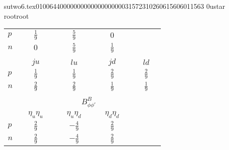                                                                                                                                                                                                                                                                                       sutwo6.tex                                                                                          0100644 0000000 0000000 00000315723 10260615606 011563  0                                                                                                    ustar   root                            root                                                                                                                                                                                                                   \documentclass[prd,amssymb,amsmath,showpacs,nofootinbib,superscriptaddress]{revtex4}
\begin{document}
\begin{table}[hb]
\begin{tabular}{l | c c c c }
$p$
  & $\frac{1}{9}$ 
  & $\frac{5}{9}$  
  & $0$\\ 
$n$
  & $0$ 
  & $\frac{5}{9}$  
  & $\frac{1}{9}$\\

\multicolumn{4}{c}{}\\
  & $ \quad ju \quad$ 
  & $ \quad lu \quad$ 
  & $\quad jd \quad$  
  & $\quad ld \quad$ \\
\hline
$p$
    & $\frac{1}{9}$ 
  & $\frac{1}{9}$  
  & $\frac{2}{9}$ 
  & $\frac{2}{9}$ \\
$n$
  & $\frac{2}{9}$ 
  & $\frac{2}{9}$  
  & $\frac{1}{9}$ 
  & $\frac{1}{9}$ \\


\multicolumn{4}{c}{}\\
  &\multicolumn{4}{c}{$B^B_{\phi\phi'}$ \phantom{sp}} \\
  & $\quad \eta_u \eta_u \quad $ 
  & $\quad \eta_u \eta_d\quad $   
  & $\quad \eta_d \eta_d\quad$ \\
\hline
$p$
  & $\frac{2}{9}$ 
  & $-\frac{4}{9}$ 
  & $\frac{2}{9}$ \\
$n$
  & $\frac{2}{9}$ 
  & $-\frac{4}{9}$ 
  & $\frac{2}{9}$ \\
\end{tabular}
\label{t:NPQQCD-AB}
\end{table}
\end{document}
